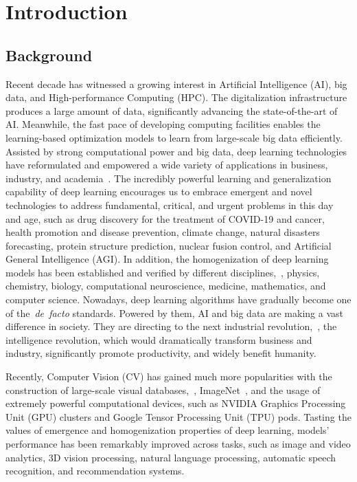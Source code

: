 \chapter{Introduction}\label{chap:introduction}
\graphicspath{{Chapter1/}}

\section{Background}
	Recent decade has witnessed a growing interest in Artificial Intelligence (AI), big data, and High-performance Computing (HPC). The digitalization infrastructure produces a large amount of data, significantly advancing the state-of-the-art of AI. Meanwhile, the fast pace of developing computing facilities enables the learning-based optimization models to learn from large-scale big data efficiently. Assisted by strong computational power and big data, deep learning technologies have reformulated and empowered a wide variety of applications in business, industry, and academia~\citep{lecun2015deep, bommasani2021opportunities}. The incredibly powerful learning and generalization capability of deep learning encourages us to embrace emergent and novel technologies to address fundamental, critical, and urgent problems in this day and age, such as drug discovery for the treatment of COVID-19 and cancer, health promotion and disease prevention, climate change, natural disasters forecasting, protein structure prediction, nuclear fusion control, and Artificial General Intelligence (AGI). In addition, the homogenization of deep learning models has been established and verified by different disciplines,~\eg, physics, chemistry, biology, computational neuroscience, medicine, mathematics, and computer science. Nowadays, deep learning algorithms have gradually become one of the~\textit{de~facto} standards. Powered by them, AI and big data are making a vast difference in society. They are directing to the next industrial revolution,~\ie, the intelligence revolution, which would dramatically transform business and industry, significantly promote productivity, and widely benefit humanity.
	
	Recently, Computer Vision (CV) has gained much more popularities with the construction of large-scale visual databases,~\eg, ImageNet~\citep{deng2009imagenet}, and the usage of extremely powerful computational devices, such as NVIDIA Graphics Processing Unit (GPU) clusters and Google Tensor Processing Unit (TPU) pods. Tasting the values of emergence and homogenization properties of deep learning, models' performance has been remarkably improved across tasks, such as image and video analytics, 3D vision processing, natural language processing, automatic speech recognition, and recommendation systems. 
	
